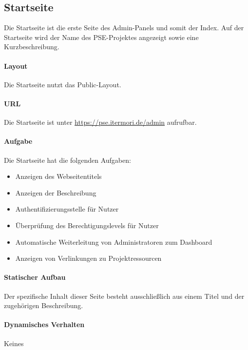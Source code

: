 \subsection{Startseite}

Die Startseite ist die erste Seite des Admin-Panels und somit der Index.
Auf der Startseite wird der Name des PSE-Projektes angezeigt sowie eine Kurzbeschreibung.

\paragraph{Layout}
Die Startseite nutzt das Public-Layout.

\paragraph*{URL}
Die Startseite ist unter \href{https://pse.itermori.de/admin}{https://pse.itermori.de/admin} aufrufbar.

\paragraph{Aufgabe}
Die Startseite hat die folgenden Aufgaben:

\begin{itemize}
    \item Anzeigen des Webseitentitels
    \item Anzeigen der Beschreibung
    \item Authentifizierungsstelle für Nutzer
    \item Überprüfung des Berechtigungslevels für Nutzer
    \item Automatische Weiterleitung von Administratoren zum Dashboard
    \item Anzeigen von Verlinkungen zu Projektressourcen
\end{itemize}

\paragraph*{Statischer Aufbau}
Der spezifische Inhalt dieser Seite besteht ausschließlich aus einem Titel und der zugehörigen Beschreibung.

\paragraph*{Dynamisches Verhalten}
Keines
